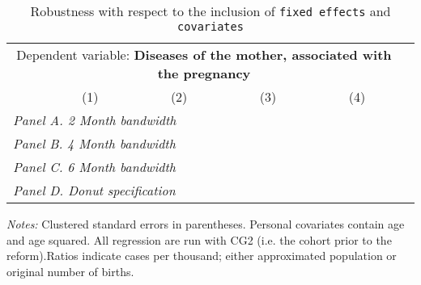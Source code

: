 \begin{table}[H] \begin{threeparttable} \centering \caption{Robustness with respect to the inclusion of \texttt{fixed effects} and \texttt{covariates}} {\def\sym#1{\ifmmode^{#1}\else\(^{#1}\)\fi} \begin{tabular}{l*{5}{c}} \toprule \multicolumn{5}{c}{Dependent variable: \textbf{Diseases of the mother, associated with the pregnancy}} \\ \cmidrule(lr){2-5}
            &\multicolumn{1}{c}{(1)}&\multicolumn{1}{c}{(2)}&\multicolumn{1}{c}{(3)}&\multicolumn{1}{c}{(4)}\\
\midrule
 \multicolumn{5}{l}{\emph{Panel A. 2 Month bandwidth}} \\    \midrule\multicolumn{5}{l}{\emph{Panel B. 4 Month bandwidth}} \\    \midrule\multicolumn{5}{l}{\emph{Panel C. 6 Month bandwidth}} \\    \midrule\multicolumn{5}{l}{\emph{Panel D. Donut specification}} \\    \midrule  
\bottomrule \end{tabular} } \begin{tablenotes} \item \scriptsize \emph{Notes:} Clustered standard errors in parentheses. Personal covariates contain age and age squared. All regression are run with CG2 (i.e. the cohort prior to the reform).Ratios indicate cases per thousand; either approximated population or original number of births. \end{tablenotes} \end{threeparttable} \end{table} 
